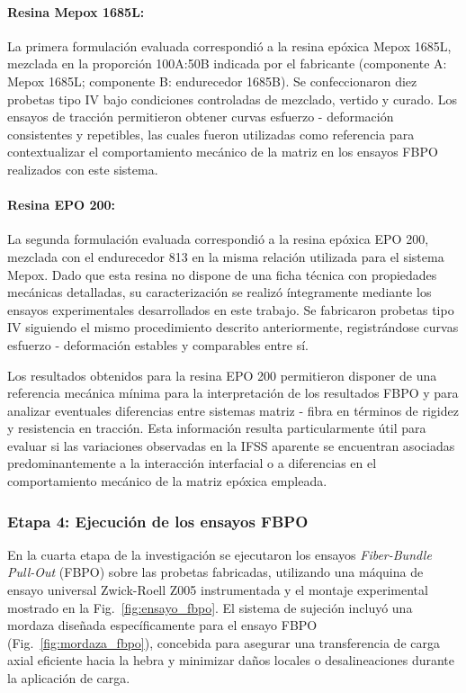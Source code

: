 \paragraph{Resina Mepox 1685L:}
La primera formulación evaluada correspondió a la resina epóxica Mepox 1685L, mezclada en la
proporción 100A:50B indicada por el fabricante (componente A: Mepox 1685L; componente B:
endurecedor 1685B). Se confeccionaron diez probetas tipo IV bajo condiciones controladas de
mezclado, vertido y curado. Los ensayos de tracción permitieron obtener curvas
esfuerzo - deformación consistentes y repetibles, las cuales fueron utilizadas como referencia
para contextualizar el comportamiento mecánico de la matriz en los ensayos FBPO realizados con
este sistema.

\paragraph{Resina EPO 200:}
La segunda formulación evaluada correspondió a la resina epóxica EPO 200, mezclada con el
endurecedor 813 en la misma relación utilizada para el sistema Mepox. Dado que esta resina no
dispone de una ficha técnica con propiedades mecánicas detalladas, su caracterización se
realizó íntegramente mediante los ensayos experimentales desarrollados en este trabajo. Se
fabricaron probetas tipo IV siguiendo el mismo procedimiento descrito anteriormente,
registrándose curvas esfuerzo - deformación estables y comparables entre sí.

Los resultados obtenidos para la resina EPO 200 permitieron disponer de una referencia mecánica
mínima para la interpretación de los resultados FBPO y para analizar eventuales diferencias
entre sistemas matriz - fibra en términos de rigidez y resistencia en tracción. Esta información
resulta particularmente útil para evaluar si las variaciones observadas en la IFSS aparente se
encuentran asociadas predominantemente a la interacción interfacial o a diferencias en el
comportamiento mecánico de la matriz epóxica empleada.

\subsubsection{Etapa 4: Ejecución de los ensayos FBPO}

En la cuarta etapa de la investigación se ejecutaron los ensayos \textit{Fiber-Bundle Pull-Out}
(FBPO) sobre las probetas fabricadas, utilizando una máquina de ensayo universal Zwick-Roell Z005
instrumentada y el montaje experimental mostrado en la Fig.~\ref{fig:ensayo_fbpo}. El sistema
de sujeción incluyó una mordaza diseñada específicamente para el ensayo FBPO
(Fig.~\ref{fig:mordaza_fbpo}), concebida para asegurar una transferencia de carga axial eficiente
hacia la hebra y minimizar daños locales o desalineaciones durante la aplicación de carga.

